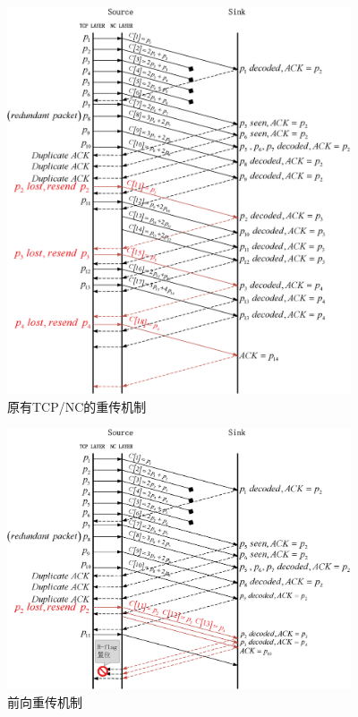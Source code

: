 \begin{figure}[htbp]
	\centering
	\includegraphics[width=4in]{figures/fr.eps}
	\caption{原有TCP/NC的重传机制}
	\label{FR_EPS}
\end{figure}
\begin{figure}
	\centering
	\includegraphics[width=4in]{figures/newfr.eps}
	\caption{前向重传机制}
	\label{NEWFR_EPS}
\end{figure}
